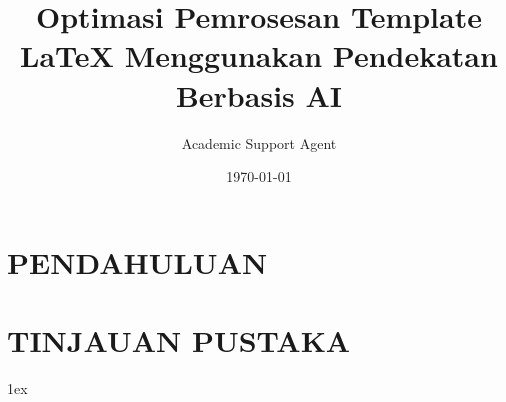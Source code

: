 \documentclass{book}
\title{Optimasi Pemrosesan Template LaTeX Menggunakan Pendekatan Berbasis AI}
\author{Academic Support Agent}
\date{\today}
\begin{document}
\maketitle

\begin{abstract}

\end{abstract}

\chapter{PENDAHULUAN}


\chapter{TINJAUAN PUSTAKA}



\usepackage[
backend=biber,
style=numeric,
sorting=ynt
]{biblatex}


\usepackage{amsmath, amssymb, amsthm} %
\usepackage{graphicx,color}           %
\usepackage[left=1.5in, right=1in, top=1in, bottom=1in, includefoot, headheight=13.6pt]{geometry}
\usepackage{acronym}
\usepackage{lmodern}                  %
\usepackage[T1]{fontenc}              %
\usepackage{mathptmx}              %

\usepackage{url}

\usepackage{sectsty}
\chapterfont{\Large\sc\centering}
\chaptertitlefont{\centering}
\subsubsectionfont{\centering}

\usepackage[hang, small, bf, margin=0pt, tableposition=bottom]{caption}
\setlength{\abovecaptionskip}{10pt}   %

\usepackage[table]{xcolor}
\usepackage{colortbl}

\newcommand{\mc}[2]{\multicolumn{#1}{c}{#2}}


\parindent 0pt
\parskip 1ex
\renewcommand{\baselinestretch}{1.49}
\renewcommand{\bibname}{References}
\renewcommand{\contentsname}{Contents}
\end{document}
